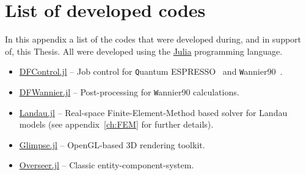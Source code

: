 \chapter{List of developed codes}
In this appendix a list of the codes that were developed during, and in support of, this Thesis. All were developed using the \href{https://julialang.org}{Julia} programming language.
\begin{itemize}
	\item \href{https://github.com/louisponet/DFControl.jl}{DFControl.jl} -- Job control for {\texttt Quantum ESPRESSO}~\cite{Giannozzi2009} and {\texttt Wannier90}~\cite{Mostofi2014AnFunctions}.
	\item \href{https://github.com/louisponet/DFWannier.jl}{DFWannier.jl} -- Post-processing for {\texttt Wannier90} calculations.
	\item \href{https://github.com/louisponet/Landau.jl}{Landau.jl} -- Real-space Finite-Element-Method based solver for Landau models (see appendix~\ref{ch:FEM} for further details).
	\item \href{https://github.com/louisponet/Glimpse.jl}{Glimpse.jl} -- OpenGL-based 3D rendering toolkit.
	\item \href{https://github.com/louisponet/Overseer.jl}{Overseer.jl} -- Classic entity-component-system.
\end{itemize}
